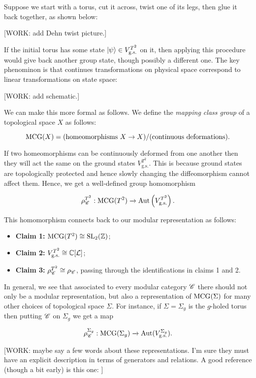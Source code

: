 Suppose we start with a torus, cut it across, twist one of its legs, then glue it back together, as shown below:

[WORK: add Dehn twist picture.]

If the initial torus has some state $\ket{\psi}\in V_{\text{g.s.}}^{T^2}$ on it, then applying this procedure would give back another group state, though possibly a different one. The key phenominon is that continues transformations on physical space correspond to linear transformations on state space:

[WORK: add schematic.]

We can make this more formal as follows. We define the \textit{mapping class group} of a topological space $X$ as follows:

$$\operatorname{MCG}(X)=(\text{homeomorphisms $X\to X$})/(\text{continuous deformations}).$$

If two homeomorphisms can be continuously deformed from one another then they will act the same on the ground states $V_{\text{g.s.}}^{T^2}$. This is because ground states are topologically protected and hence slowly changing the diffeomorphism cannot affect them. Hence, we get a well-defined group homomorphism

$$\rho_{\mathscr{C}}^{T^2}:\operatorname{MCG}(T^2)\xrightarrow{}\operatorname{Aut}\left(V_{\text{g.s.}}^{T^2}\right).$$

This homomorphism connects back to our modular representation as follows:

\begin{itemize}
\item \textbf{Claim 1:} $\operatorname{MCG}(T^2)\cong \operatorname{SL}_2(\mathbb{Z})$;

\item \textbf{Claim 2:} $V_{\text{g.s.}}^{T^2}\cong \mathbb{C}[\mathcal{L}]$;

\item \textbf{Claim 3:} $\rho_{\mathscr{C}}^{T^2}\cong \rho_{\mathscr{C}}$, passing through the identifications in claims 1 and 2.
\end{itemize}

In general, we see that associated to every modular category $\mathscr{C}$ there should not only be a modular representation, but also a representation of $\operatorname{MCG}(\Sigma)$ for many other choices of topological space $\Sigma$. For instance, if $\Sigma=\Sigma_g$ is the $g$-holed torus then putting $\mathscr{C}$ on $\Sigma_g$ we get a map

$$\rho_{\mathscr{C}}^{\Sigma_g}:\operatorname{MCG}(\Sigma_g)\xrightarrow{}\operatorname{Aut}(V_{\text{g.s.}}^{\Sigma_g}).$$

[WORK: maybe say a few words about these representations. I'm sure they must have an explicit description in terms of generators and relations. A good reference (though a bit early) is this one: \cite{lyubashenko1995invariants}]

